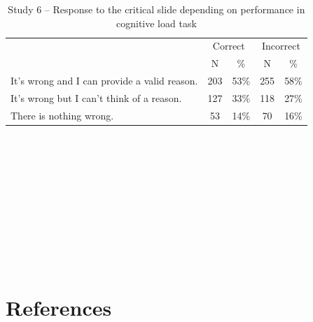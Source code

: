 \documentclass[
  man,floatsintext]{apa6}
\begin{document}
\begin{table}[tbp]

\begin{center}
\begin{threeparttable}

\caption{\label{tab:tabS6EngagementAndDumbfounding}Study 6 – Response to the critical slide depending on performance in cognitive load task}

\begin{tabular}{lcccc}
\toprule
 & \multicolumn{2}{c}{Correct} & \multicolumn{2}{c}{Incorrect} \\
\cmidrule(r){2-3} \cmidrule(r){4-5}
 & \multicolumn{1}{c}{N} & \multicolumn{1}{c}{\%} & \multicolumn{1}{c}{N} & \multicolumn{1}{c}{\%}\\
\midrule
It's wrong and I can provide a valid reason. & 203 & 53\% & 255 & 58\%\\
It's wrong but I can't think of a reason. & 127 & 33\% & 118 & 27\%\\
There is nothing wrong. & 53 & 14\% & 70 & 16\%\\
\bottomrule
\end{tabular}

\end{threeparttable}
\end{center}

\end{table}

\newpage

~

\newpage

~

\newpage

~

\newpage

~

\newpage

~

\newpage

~

\newpage

\hypertarget{references}{%
\section{References}\label{references}}

\setlength{\parindent}{-0.5in}
\setlength{\leftskip}{0.5in}
\setlength{\parskip}{8pt}
\end{document}
